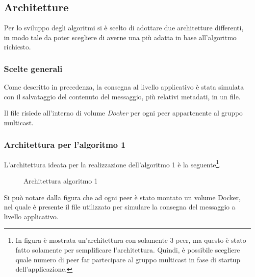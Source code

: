 \documentclass[acmtog]{acmart}
\begin{document}
\subsection{Architetture}
Per lo sviluppo degli algoritmi si è scelto di adottare due architetture differenti, in modo tale da poter scegliere di averne una più adatta in base all'algoritmo richiesto.

\subsubsection{Scelte generali} Come descritto in precedenza, la consegna al livello applicativo è stata simulata con il salvataggio del contenuto del messaggio, più relativi metadati, in un file. 

Il file risiede all'interno di volume \textit{Docker} per ogni peer appartenente al gruppo multicast.

\subsubsection{Architettura per l'algoritmo 1}
L'architettura ideata per la realizzazione dell'algoritmo 1 è la seguente\footnote{In figura è mostrata un'architettura con solamente $3$ peer, ma questo è stato fatto solamente per semplificare l'architettura. Quindi, è possibile scegliere quale numero di peer far partecipare al gruppo multicast in fase di startup dell'applicazione.}.

\begin{figure}[ht!]
\centering
{}
\caption{Architettura algoritmo 1}
\end{figure} 

Si può notare dalla figura che ad ogni peer è stato montato un volume Docker, nel quale è presente il file utilizzato per simulare la consegna del messaggio a livello applicativo. 
\end{document}
